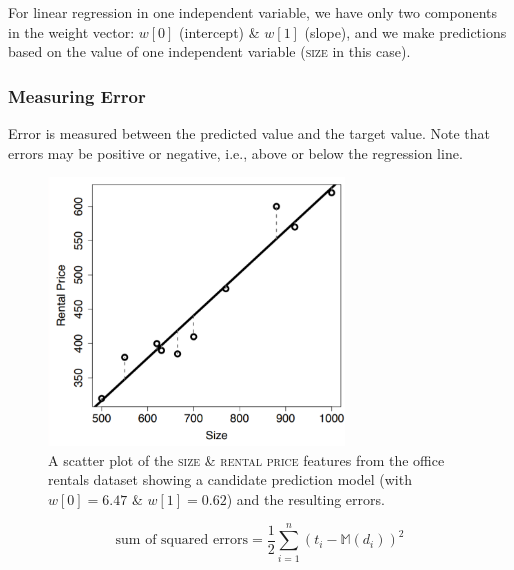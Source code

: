 \documentclass[a4paper,11pt]{article}
\begin{document}
For linear regression in one independent variable, we have only two components in the weight vector: $w[0]$ (intercept) \& $w[1]$ (slope), and we make predictions based on the value of one independent variable (\textsc{size} in this case).

\subsubsection{Measuring Error}
Error is measured between the predicted value and the target value.
Note that errors may be positive or negative, i.e., above or below the regression line.

\begin{figure}[H]
    \centering
    \includegraphics[width=0.7\textwidth]{images/measuringerror.png}
    \caption{
        A scatter plot of the \textsc{size} \& \textsc{rental price} features from the office rentals dataset showing a candidate prediction model (with $w[0] = 6.47$ \& $w[1] = 0.62$) and the resulting errors.
    }
\end{figure}

\[
    \text{sum of squared errors} = \frac{1}{2} \sum^n_{i=1} \left(t_i - \mathbb{M}\left(d_i\right)\right)^2
\]
\end{document}
